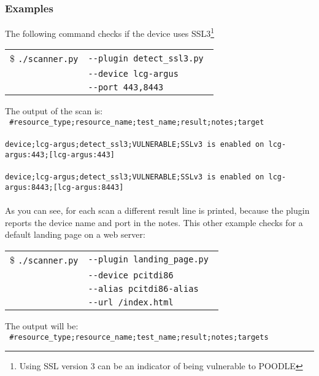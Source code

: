 \subsubsection{Examples}
The following command checks if the device uses SSL3\footnote{Using SSL version 3 can be an indicator of being vulnerable to POODLE}
\begin{table}[H]

    \begin{tabular}{ c  l }


\$ \texttt{./scanner.py} & \texttt{-{}-plugin detect\_ssl3.py } \\
  & \texttt{-{}-device lcg-argus} \\
  & \texttt{-{}-port 443,8443}    	       
	\end{tabular}    

\end{table}
\noindent
The output of the scan is: 
\\
\texttt{
\#resource\_type;resource\_name;test\_name;result;notes;target}
\\
\\
\texttt{device;lcg-argus;detect\_ssl3;VULNERABLE;SSLv3 is enabled on lcg-argus:443;[lcg-argus:443]}
\\
\\
\texttt{device;lcg-argus;detect\_ssl3;VULNERABLE;SSLv3 is enabled on lcg-argus:8443;[lcg-argus:8443]}
\\
\\
As you can see, for each scan a different result line is printed, because the plugin reports the device name and port in the notes. 
This other example checks for a default landing page on a web server:
\begin{table}[H]

    \begin{tabular}{ c  l }


\$ \texttt{./scanner.py} & \texttt{-{}-plugin landing\_page.py } \\
  & \texttt{-{}-device pcitdi86} \\
  & \texttt{-{}-alias pcitdi86-alias}\\    	       
    & \texttt{-{}-url /index.html}\\ 
	\end{tabular}    

\end{table}
\noindent
The output will be:
\\
\texttt{
\#resource\_type;resource\_name;test\_name;result;notes;targets}
\\
